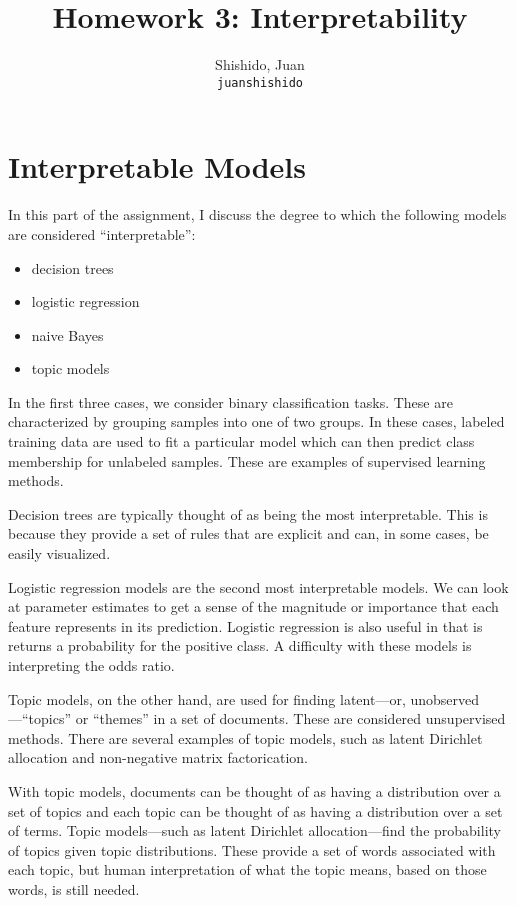 \documentclass[11pt]{article}
\title{Homework 3: Interpretability}
\author{
  Shishido, Juan\\
  \texttt{juanshishido}
}
\begin{document}
\maketitle

\section{Interpretable Models}

In this part of the assignment, I discuss the degree to which the following
models are considered ``interpretable'':

\begin{itemize}  
    \item decision trees
    \item logistic regression
    \item naive Bayes
    \item topic models
\end{itemize}

In the first three cases, we consider binary classification tasks. These are
characterized by grouping samples into one of two groups. In these cases,
labeled training data are used to fit a particular model which can then predict
class membership for unlabeled samples. These are examples of supervised
learning methods.

Decision trees are typically thought of as being the most interpretable. This
is because they provide a set of rules that are explicit and can, in some
cases, be easily visualized.

Logistic regression models are the second most interpretable models. We can
look at parameter estimates to get a sense of the magnitude or importance that
each feature represents in its prediction. Logistic regression is also useful
in that is returns a probability for the positive class. A difficulty with
these models is interpreting the odds ratio.

Topic models, on the other hand, are used for finding latent---or,
unobserved---``topics'' or ``themes'' in a set of documents. These are
considered unsupervised methods. There are several examples of topic models,
such as latent Dirichlet allocation and non-negative matrix factorication.

With topic models, documents can be thought of as having a 
distribution over a set of topics and each topic can be thought of as having a
distribution over a set of terms. Topic models---such as latent Dirichlet
allocation---find the probability of topics given topic distributions. These
provide a set of words associated with each topic, but human interpretation
of what the topic means, based on those words, is still needed.
\end{document}

